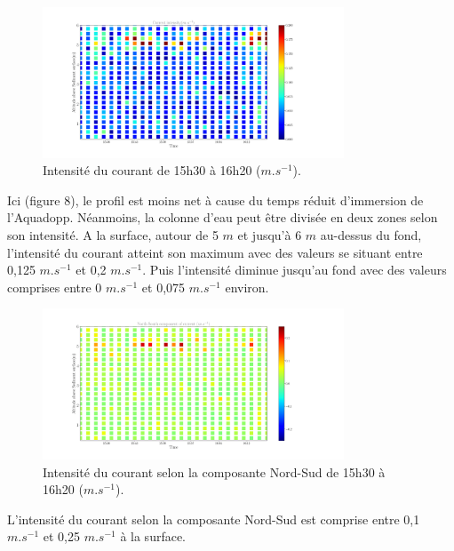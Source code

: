 \documentclass[12pt]{article}
\begin{document}
\begin{figure}[!ht]
	\begin{center}
		\includegraphics[width=0.8\textwidth]{18032102scatterintensity.png}
		\caption{Intensité du courant de 15h30 à 16h20 ($m.s^{-1}$).}
	\end{center}
\end{figure}
Ici (figure 8), le profil est moins net à cause du temps réduit d'immersion de l'Aquadopp. Néanmoins, la colonne d'eau peut être divisée en deux zones selon son intensité. A la surface, autour de 5 $m$ et jusqu'à 6 $m$ au-dessus du fond, l'intensité du courant atteint son maximum avec des valeurs se situant entre 0,125 $m.s^{-1}$ et 0,2 $m.s^{-1}$. Puis l'intensité diminue jusqu'au fond avec des valeurs comprises entre 0 $m.s^{-1}$ et 0,075 $m.s^{-1}$ environ.\\

\begin{figure}[!ht]
	\begin{center}
		\includegraphics[width=0.8\textwidth]{18032102scatterv2.png}
		\caption{Intensité du courant selon la composante Nord-Sud de 15h30 à 16h20 ($m.s^{-1}$).}
	\end{center}
\end{figure}
L'intensité du courant selon la composante Nord-Sud est comprise entre 0,1 $m.s^{-1}$ et 0,25 $m.s^{-1}$ à la surface.\\
\end{document}
